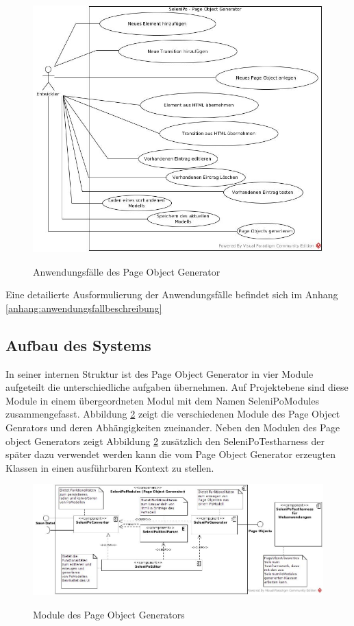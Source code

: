 \begin{figure}[htb]
  \centering  
  \includegraphics[scale=0.45]{img/Use-Cases.jpg}\\
  \caption{Anwendungsfälle des Page Object Generator}
  \label{fig:use_case}
\end{figure}

Eine detailierte Ausformulierung der Anwendungsfälle befindet sich im Anhang \ref{anhang:anwendungsfallbeschreibung}

\newpage

\subsection{Aufbau des Systems}
\label{sec:aufbau_des_systems}
In seiner internen Struktur ist des Page Object Generator in vier Module aufgeteilt die unterschiedliche aufgaben übernehmen. Auf Projektebene sind diese Module in einem übergeordneten Modul mit dem Namen SeleniPoModules zusammengefasst. Abbildung \ref{fig:component_diagramm} zeigt die verschiedenen Module des Page Object Genrators und deren Abhängigkeiten zueinander.
Neben den Modulen des Page object Generators zeigt Abbildung \ref{fig:component_diagramm} zusätzlich den SeleniPoTestharness der später dazu verwendet werden kann die vom Page Object Generator erzeugten Klassen in einen ausführbaren Kontext zu stellen.

\begin{figure}[htb]
  \centering  
  \includegraphics[scale=0.46]{img/ComponentDiagram.jpg}\\
  \caption{Module des Page Object Generators}
  \label{fig:component_diagramm}
\end{figure}

